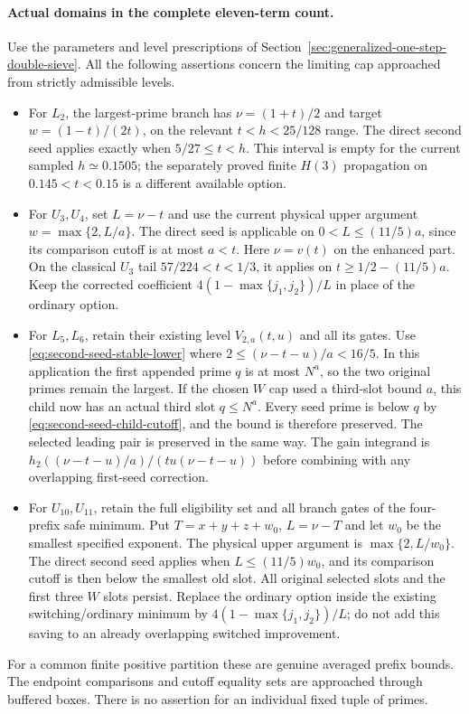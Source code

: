 \paragraph{Actual domains in the complete eleven-term count.}
Use the parameters and level prescriptions of
Section~\ref{sec:generalized-one-step-double-sieve}.  All the
following assertions concern the limiting cap approached from
strictly admissible levels.
\begin{itemize}
\item For $L_2$, the largest-prime branch has
$\nu=(1+t)/2$ and target $w=(1-t)/(2t)$, on the relevant
$t<h<25/128$ range.  The direct second seed applies exactly when
$5/27\le t<h$.  This interval is empty for the current sampled
$h\simeq0.1505$; the separately proved finite $H(3)$ propagation
on $0.145<t<0.15$ is a different available option.
\item For $U_3,U_4$, set $L=\nu-t$ and use the current physical
upper argument $w=\max\{2,L/a\}$.  The direct seed is applicable
on $0<L\le(11/5)a$, since its comparison cutoff is at most $a<t$.
Here $\nu=v(t)$ on the enhanced part.  On the classical $U_3$
tail $57/224<t<1/3$, it applies on
$t\ge1/2-(11/5)a$.  Keep the corrected coefficient
$4(1-\max\{j_1,j_2\})/L$ in place of the ordinary option.
\item For $L_5,L_6$, retain their existing level $V_{2,a}(t,u)$
and all its gates.  Use \eqref{eq:second-seed-stable-lower} where
$2\le(\nu-t-u)/a<16/5$.  In this application the first appended
prime $q$ is at most $N^a$, so the two original primes remain the
largest.  If the chosen $W$ cap used a third-slot bound $a$, this
child now has an actual third slot $q\le N^a$.  Every seed prime
is below $q$ by \eqref{eq:second-seed-child-cutoff}, and the bound
is therefore preserved.  The selected leading pair is preserved
in the same way.  The gain integrand is
$h_2((\nu-t-u)/a)/(tu(\nu-t-u))$ before combining with any
overlapping first-seed correction.
\item For $U_{10},U_{11}$, retain the full eligibility set and
all branch gates of the four-prefix safe minimum.  Put
$T=x+y+z+w_0$, $L=\nu-T$ and let $w_0$ be the smallest specified
exponent.  The physical upper argument is
$\max\{2,L/w_0\}$.  The direct second seed applies when
$L\le(11/5)w_0$, and its comparison cutoff is then below the
smallest old slot.  All original selected slots and the first
three $W$ slots persist.  Replace the ordinary option inside the
existing switching/ordinary minimum by
$4(1-\max\{j_1,j_2\})/L$; do not add this saving to an already
overlapping switched improvement.
\end{itemize}
For a common finite positive partition these are genuine averaged
prefix bounds.  The endpoint comparisons and cutoff equality sets
are approached through buffered boxes.  There is no assertion for
an individual fixed tuple of primes.

